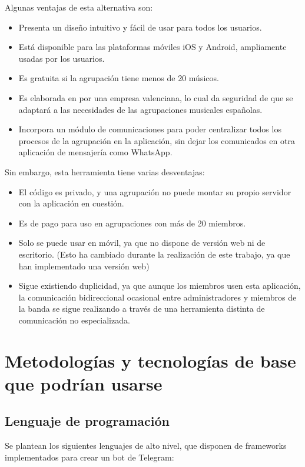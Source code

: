 Algunas ventajas de esta alternativa son:

\begin{itemize}
    \item Presenta un diseño intuitivo y fácil de usar para todos los usuarios.
    \item Está disponible para las plataformas móviles iOS y Android, ampliamente usadas por los usuarios.
    \item Es gratuita si la agrupación tiene menos de 20 músicos.
    \item Es elaborada en por una empresa valenciana, lo cual da seguridad de que se adaptará a las necesidades de las agrupaciones musicales españolas.
    \item Incorpora un módulo de comunicaciones para poder centralizar todos los procesos de la agrupación en la aplicación, sin dejar los comunicados en otra aplicación de mensajería como WhatsApp.
\end{itemize}

Sin embargo, esta herramienta tiene varias desventajas:

\begin{itemize}
    \item El código es privado, y una agrupación no puede montar su propio servidor con la aplicación en cuestión.
    \item Es de pago para uso en agrupaciones con más de 20 miembros.
    \item Solo se puede usar en móvil, ya que no dispone de versión web ni de escritorio. (Esto ha cambiado durante la realización de este trabajo, ya que han implementado una versión web)
    \item Sigue existiendo duplicidad, ya que aunque los miembros usen esta aplicación, la comunicación bidireccional ocasional entre administradores y miembros de la banda se sigue realizando a través de una herramienta distinta de comunicación no especializada.
\end{itemize}


\section{Metodologías y tecnologías de base que podrían usarse}

\subsection{Lenguaje de programación}
Se plantean los siguientes lenguajes de alto nivel, que disponen de frameworks implementados para crear un bot de Telegram:

